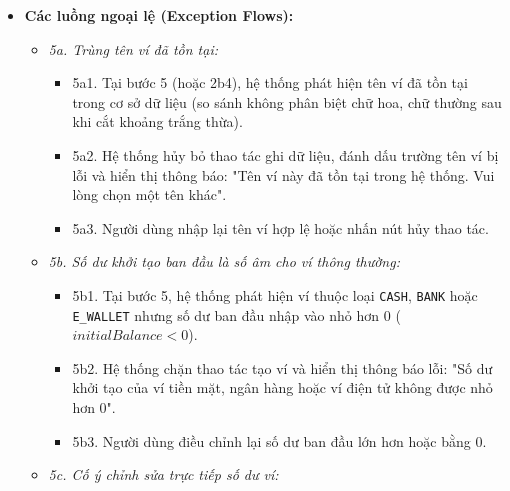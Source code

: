 \documentclass[11pt,a4paper]{article}
\providecommand{\tightlist}{
  \setlength{\itemsep}{0pt}\setlength{\parskip}{0pt}}
\begin{document}
\begin{itemize}
\begin{itemize}
    \begin{itemize}
    \tightlist
    \item
      2d1. Người dùng chọn tab "Cơ cấu phân bổ ví".
    \item
      2d2. Hệ thống tính tổng số dư tất cả các ví đang \texttt{ACTIVE}:
      \(TotalWallets = \sum Balance_w\).
    \item
      2d3. Nếu \(TotalWallets > 0\), hệ thống tính tỷ trọng phần trăm
      từng ví theo công thức:
      \(Rate_w = (Balance_w / TotalWallets) \times 100\%\), sử dụng
      \texttt{BigDecimal.divide()} với \texttt{RoundingMode.HALF\_EVEN}
      và scale tối thiểu 4 chữ số thập phân, định dạng 2 chữ số thập
      phân ra giao diện.
    \item
      2d4. Hệ thống sắp xếp các ví theo thứ tự tỷ trọng giảm dần và hiển
      thị dưới dạng bảng dữ liệu kèm biểu đồ trực quan.
    \end{itemize}
  \end{itemize}
\item
  \textbf{Các luồng ngoại lệ (Exception Flows):}

  \begin{itemize}
  \tightlist
  \item
    \emph{5a. Trùng tên ví đã tồn tại:}

    \begin{itemize}
    \tightlist
    \item
      5a1. Tại bước 5 (hoặc 2b4), hệ thống phát hiện tên ví đã tồn tại
      trong cơ sở dữ liệu (so sánh không phân biệt chữ hoa, chữ thường
      sau khi cắt khoảng trắng thừa).
    \item
      5a2. Hệ thống hủy bỏ thao tác ghi dữ liệu, đánh dấu trường tên ví
      bị lỗi và hiển thị thông báo: "Tên ví này đã tồn tại trong hệ
      thống. Vui lòng chọn một tên khác".
    \item
      5a3. Người dùng nhập lại tên ví hợp lệ hoặc nhấn nút hủy thao tác.
    \end{itemize}
  \item
    \emph{5b. Số dư khởi tạo ban đầu là số âm cho ví thông thường:}

    \begin{itemize}
    \tightlist
    \item
      5b1. Tại bước 5, hệ thống phát hiện ví thuộc loại \texttt{CASH},
      \texttt{BANK} hoặc \texttt{E\_WALLET} nhưng số dư ban đầu nhập vào
      nhỏ hơn 0 (\(initialBalance < 0\)).
    \item
      5b2. Hệ thống chặn thao tác tạo ví và hiển thị thông báo lỗi: "Số
      dư khởi tạo của ví tiền mặt, ngân hàng hoặc ví điện tử không được
      nhỏ hơn 0".
    \item
      5b3. Người dùng điều chỉnh lại số dư ban đầu lớn hơn hoặc bằng 0.
    \end{itemize}
  \item
    \emph{5c. Cố ý chỉnh sửa trực tiếp số dư ví:}


\end{itemize}
\end{itemize}
\end{document}
